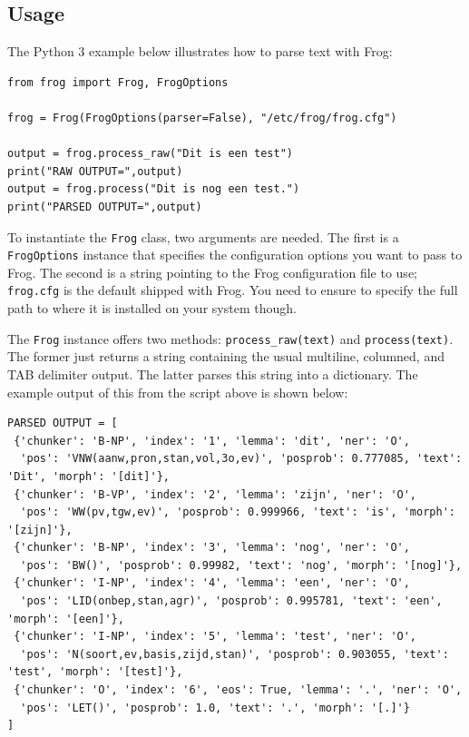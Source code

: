 \documentclass{book}
\begin{document}
\subsection{Usage}

The Python 3 example below illustrates how to parse text with Frog:

\begin{verbatim}
from frog import Frog, FrogOptions

frog = Frog(FrogOptions(parser=False), "/etc/frog/frog.cfg")

output = frog.process_raw("Dit is een test")
print("RAW OUTPUT=",output)
output = frog.process("Dit is nog een test.")
print("PARSED OUTPUT=",output)
\end{verbatim}

To instantiate the \texttt{Frog} class, two arguments are needed. The first is a
\texttt{FrogOptions} instance that specifies the configuration options you want to
pass to Frog. The second is a string pointing to the Frog configuration file to
use; \texttt{frog.cfg} is the default shipped with Frog. You need to ensure to
specify the full path to where it is installed on your system though.

The \texttt{Frog} instance offers two methods: \texttt{process\_raw(text)} and
\texttt{process(text)}. The former just returns a string containing the usual
multiline, columned, and TAB delimiter output. The latter parses this string
into a dictionary. The example output of this from the script above is shown
below:

\begin{verbatim}
PARSED OUTPUT = [
 {'chunker': 'B-NP', 'index': '1', 'lemma': 'dit', 'ner': 'O',
  'pos': 'VNW(aanw,pron,stan,vol,3o,ev)', 'posprob': 0.777085, 'text': 'Dit', 'morph': '[dit]'},
 {'chunker': 'B-VP', 'index': '2', 'lemma': 'zijn', 'ner': 'O',
  'pos': 'WW(pv,tgw,ev)', 'posprob': 0.999966, 'text': 'is', 'morph': '[zijn]'},
 {'chunker': 'B-NP', 'index': '3', 'lemma': 'nog', 'ner': 'O',
  'pos': 'BW()', 'posprob': 0.99982, 'text': 'nog', 'morph': '[nog]'},
 {'chunker': 'I-NP', 'index': '4', 'lemma': 'een', 'ner': 'O',
  'pos': 'LID(onbep,stan,agr)', 'posprob': 0.995781, 'text': 'een', 'morph': '[een]'},
 {'chunker': 'I-NP', 'index': '5', 'lemma': 'test', 'ner': 'O',
  'pos': 'N(soort,ev,basis,zijd,stan)', 'posprob': 0.903055, 'text': 'test', 'morph': '[test]'},
 {'chunker': 'O', 'index': '6', 'eos': True, 'lemma': '.', 'ner': 'O',
  'pos': 'LET()', 'posprob': 1.0, 'text': '.', 'morph': '[.]'}
]
\end{verbatim}
\end{document}
